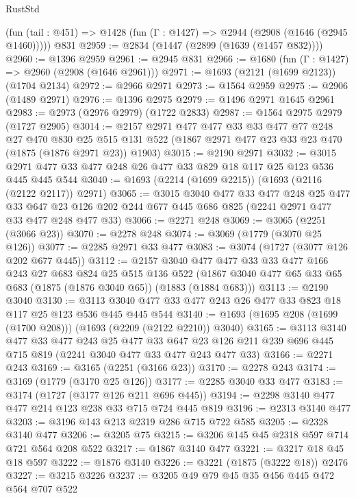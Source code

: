 \begin{lexlean}{RustStd}
\begin{coremodule}
{\begin{coremodule}
{{{{{{{{{{{    (fun (tail : @451) => @1428 (fun (Γ : @1427) => @2944 (@2908 (@1646 (@2945 @1460)))))
    @831
@2959 := @2834 (@1447 (@2899 (@1639 (@1457 @832))))
@2960 := @1396 @2959
@2961 := @2945 @831
@2966 := @1680 (fun (Γ : @1427) => @2960 (@2908 (@1646 @2961)))
@2971 := @1693 (@2121 (@1699 @2123)) (@1704 @2134)
@2972 := @2966 @2971
@2973 := @1564 @2959
@2975 := @2906 (@1489 @2971)
@2976 := @1396 @2975
@2979 := @1496 @2971 @1645 @2961
@2983 := @2973 (@2976 @2979) (@1722 @2833)
@2987 := @1564 @2975 @2979 (@1727 @2905)
@3014 := @2157
    @2971
    @477
    @477
    @33
    @33
    @477
    @77
    @248
    @27
    @470
    @830
    @25
    @515
    @131
    @522
    (@1867 @2971 @477 @23 @33 @23 @470 (@1875 (@1876 @2971 @23)) @1903)
@3015 := @2190 @2971
@3032 := @3015 @2971 @477 @33 @477 @248 @26 @477 @33 @829 @18 @117 @25 @123 @536 @445 @445 @544
@3040 := @1693 (@2214 (@1699 @2215)) (@1693 (@2116 (@2122 @2117)) @2971)
@3065 := @3015
    @3040
    @477
    @33
    @477
    @248
    @25
    @477
    @33
    @647
    @23
    @126
    @202
    @244
    @677
    @445
    @686
    @825
    (@2241 @2971 @477 @33 @477 @248 @477 @33)
@3066 := @2271 @248
@3069 := @3065 (@2251 (@3066 @23))
@3070 := @2278 @248
@3074 := @3069 (@1779 (@3070 @25 @126))
@3077 := @2285 @2971 @33 @477
@3083 := @3074 (@1727 (@3077 @126 @202 @677 @445))
@3112 := @2157
    @3040
    @477
    @477
    @33
    @33
    @477
    @166
    @243
    @27
    @683
    @824
    @25
    @515
    @136
    @522
    (@1867 @3040 @477 @65 @33 @65 @683 (@1875 (@1876 @3040 @65)) (@1883 (@1884 @683)))
@3113 := @2190 @3040
@3130 := @3113 @3040 @477 @33 @477 @243 @26 @477 @33 @823 @18 @117 @25 @123 @536 @445 @445 @544
@3140 := @1693 (@1695 @208 (@1699 (@1700 @208))) (@1693 (@2209 (@2122 @2210)) @3040)
@3165 := @3113
    @3140
    @477
    @33
    @477
    @243
    @25
    @477
    @33
    @647
    @23
    @126
    @211
    @239
    @696
    @445
    @715
    @819
    (@2241 @3040 @477 @33 @477 @243 @477 @33)
@3166 := @2271 @243
@3169 := @3165 (@2251 (@3166 @23))
@3170 := @2278 @243
@3174 := @3169 (@1779 (@3170 @25 @126))
@3177 := @2285 @3040 @33 @477
@3183 := @3174 (@1727 (@3177 @126 @211 @696 @445))
@3194 := @2298 @3140 @477 @477 @214 @123 @238 @33 @715 @724 @445 @819
@3196 := @2313 @3140 @477
@3203 := @3196 @143 @213 @2319 @286 @715 @722 @585
@3205 := @2328 @3140 @477
@3206 := @3205 @75
@3215 := @3206 @145 @45 @2318 @597 @714 @721 @564 @208 @522
@3217 := @1867 @3140 @477
@3221 := @3217 @18 @45 @18 @597
@3222 := @1876 @3140
@3226 := @3221 (@1875 (@3222 @18)) @2476
@3227 := @3215 @3226
@3237 := @3205 @49 @79 @45 @35 @456 @445 @472 @564 @707 @522
}}}}}}}}}}}
\end{coremodule}}
\end{coremodule}
\end{lexlean}
